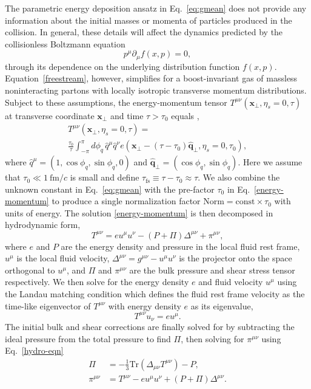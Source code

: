 \documentclass[aps,prc,reprint,amsmath,nofootinbib]{revtex4-1}
\newcommand{\fmc}{\ensuremath{\text{fm}/c}}
\newcommand{\taufs}{\tau_\text{fs}}
\newcommand{\xv}{\mathbf x}
\begin{document}
The parametric energy deposition ansatz in Eq.~\eqref{eq:gmean} does not provide any information about the initial masses or momenta of particles produced in the collision.
In general, these details will affect the dynamics predicted by the collisionless Boltzmann equation
\begin{equation}
  \label{freestream}
  p^\mu \partial_\mu f(x, p) = 0,
\end{equation}
through its dependence on the underlying distribution function $f(x, p)$.
Equation~\eqref{freestream}, however, simplifies for a boost-invariant gas of massless noninteracting partons with locally isotropic transverse momentum distributions.
Subject to these assumptions, the energy-momentum tensor $T^{\mu\nu}(\xv_\perp, \eta_s=0, \tau)$ at transverse coordinate $\xv_\perp$ and time $\tau > \tau_0$ equals \cite{Broniowski:2008qk, Liu:2015nwa},
\begin{multline}
  \label{energy-momentum}
  T^{\mu\nu}(\xv_\perp, \eta_s=0, \tau) =\\
  \frac{\tau_0}{\tau} \int_{-\pi}^{\pi} d\phi_q\, \hat{q}^\mu \hat{q}^\nu e(\xv_\perp - (\tau - \tau_0)\hat{\mathbf{q}}_\perp, \eta_s=0, \tau_0),
\end{multline}
where $\hat{q}^\mu = (1, \cos \phi_q, \sin \phi_q, 0)$ and $\hat{\mathbf{q}}_\perp = (\cos \phi_q, \sin \phi_q)$.
Here we assume that $\tau_0 \ll 1~\fmc$ is small and define $\taufs \equiv \tau - \tau_0 \approx \tau$.
We also combine the unknown constant in Eq.~\eqref{eq:gmean} with the pre-factor $\tau_0$ in Eq.~\eqref{energy-momentum} to produce a single normalization factor $\text{Norm} = \text{const} \times \tau_0$ with units of energy.
The solution \eqref{energy-momentum} is then decomposed in hydrodynamic form,
\begin{equation}
  \label{hydro-eqn}
  T^{\mu\nu} = e u^\mu u^\nu - (P + \Pi) \Delta^{\mu\nu} + \pi^{\mu\nu},
\end{equation}
where $e$ and $P$ are the energy density and pressure in the local fluid rest frame, $u^\mu$ is the local fluid velocity, ${\Delta^{\mu\nu} = g^{\mu\nu} - u^\mu u^\nu}$ is the projector onto the space orthogonal to $u^\mu$, and $\Pi$ and $\pi^{\mu\nu}$ are the bulk pressure and shear stress tensor respectively.
We then solve for the energy density $e$ and fluid velocity $u^\mu$ using the Landau matching condition which defines the fluid rest frame velocity as the time-like eigenvector of $T^{\mu\nu}$ with energy density $e$ as its eigenvalue,
\begin{equation}
  T^{\mu\nu} u_\nu = e u^\mu.
\end{equation}
The initial bulk and shear corrections are finally solved for by subtracting the ideal pressure from the total pressure to find $\Pi$, then solving for $\pi^{\mu\nu}$ using Eq.~\eqref{hydro-eqn}
\begin{align}
  \Pi &= -\frac{1}{3} \mathrm{Tr}(\Delta_{\mu\nu} T^{\mu\nu}) - P,\\
  \pi^{\mu\nu} &= T^{\mu\nu} - e u^\mu u^\nu + (P + \Pi) \Delta^{\mu\nu}.
\end{align}
\end{document}
